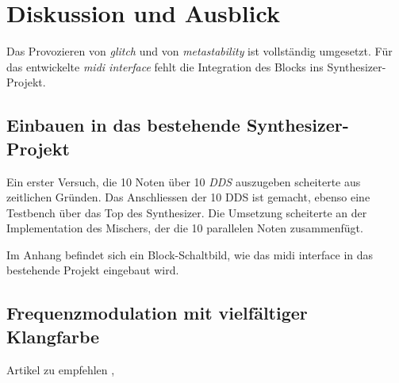
\chapter{Diskussion und Ausblick}\label{chap.diskussion}

Das Provozieren von \textit{glitch} und von \textit{metastability} ist vollständig umgesetzt. Für das entwickelte \textit{midi interface} fehlt die Integration des Blocks ins Synthesizer-Projekt. 

\section{Einbauen in das bestehende Synthesizer-Projekt}

Ein erster Versuch, die 10 Noten über 10 \textit{DDS} auszugeben scheiterte aus zeitlichen Gründen. Das Anschliessen der 10 DDS ist gemacht, ebenso eine Testbench über das Top des Synthesizer. Die Umsetzung scheiterte an der Implementation des Mischers, der die 10 parallelen Noten zusammenfügt.

Im Anhang befindet sich ein Block-Schaltbild, wie das midi interface in das bestehende Projekt eingebaut wird. 

\section{Frequenzmodulation mit vielfältiger Klangfarbe}
Artikel zu empfehlen \cite{synthesizer_1}, \cite{synthesizer_2}

